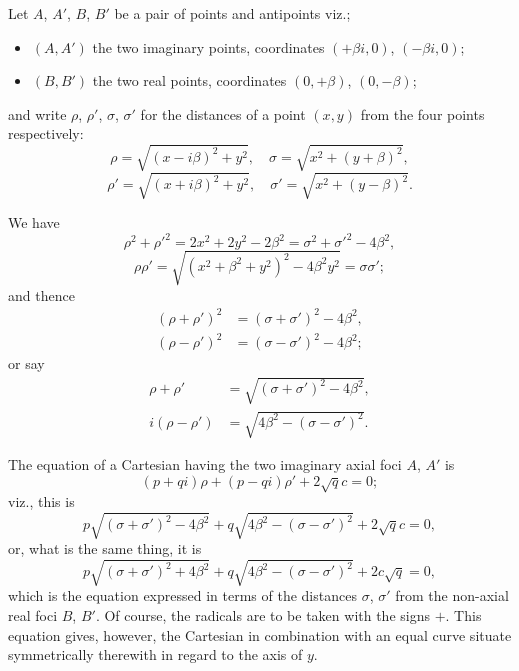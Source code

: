 \documentclass[11pt,a4paper]{article}
\begin{document}
Let $A$, $A'$, $B$, $B'$ be a pair of points and antipoints viz.;
\begin{itemize}
\item[] $(A, A')$ the two imaginary points, coordinates $(+\beta i, 0)$, $(-\beta i, 0)$;
\item[] $(B, B')$ the two real points, coordinates $(0, +\beta)$, $(0, -\beta)$;
\end{itemize}
and write $\rho$, $\rho'$, $\sigma$, $\sigma'$ for the distances of a point $(x, y)$ from the four points respectively:
\[
\rho = \sqrt{(x - i\beta)^2 + y^2},\quad \sigma = \sqrt{x^2 + (y + \beta)^2},
\]
\[
\rho' = \sqrt{(x + i\beta)^2 + y^2},\quad \sigma' = \sqrt{x^2 + (y - \beta)^2}.
\]

We have
\[
\rho^2 + \rho'^2 = 2x^2 + 2y^2 - 2\beta^2 = \sigma^2 + \sigma'^2 - 4\beta^2,
\]
\[
\rho\rho' = \sqrt{(x^2 + \beta^2 + y^2)^2 - 4\beta^2 y^2} = \sigma\sigma';
\]
and thence
\begin{align*}
(\rho + \rho')^2 &= (\sigma + \sigma')^2 - 4\beta^2, \\
(\rho - \rho')^2 &= (\sigma - \sigma')^2 - 4\beta^2;
\end{align*}
or say
\begin{align*}
\rho + \rho' &= \sqrt{(\sigma + \sigma')^2 - 4\beta^2}, \\
i(\rho - \rho') &= \sqrt{4\beta^2 - (\sigma - \sigma')^2}.
\end{align*}

The equation of a Cartesian having the two imaginary axial foci $A$, $A'$ is
\[
(p + qi)\rho + (p - qi)\rho' + 2\sqrt{q}c = 0;
\]
viz., this is
\[
p\sqrt{(\sigma + \sigma')^2 - 4\beta^2} + q\sqrt{4\beta^2 - (\sigma - \sigma')^2} + 2\sqrt{q}c = 0,
\]
or, what is the same thing, it is
\[
p\sqrt{(\sigma + \sigma')^2 + 4\beta^2} + q\sqrt{4\beta^2 - (\sigma - \sigma')^2} + 2c\sqrt{q} = 0,
\]
which is the equation expressed in terms of the distances $\sigma$, $\sigma'$ from the non-axial real foci $B$, $B'$. Of course, the radicals are to be taken with the signs $+$. This equation gives, however, the Cartesian in combination with an equal curve situate symmetrically therewith in regard to the axis of $y$.
\end{document}
